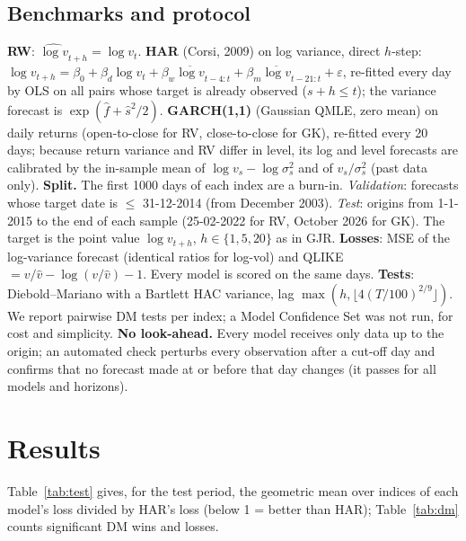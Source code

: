 \documentclass[11pt,a4paper]{article}
\begin{document}
\subsection{Benchmarks and protocol}
\textbf{RW}: $\widehat{\log v}_{t+h}=\log v_t$. \textbf{HAR} (Corsi, 2009) on log variance, direct $h$-step:
$\log v_{t+h}=\beta_0+\beta_d\log v_t+\beta_w\overline{\log v}_{t-4:t}+\beta_m\overline{\log v}_{t-21:t}+\varepsilon$,
re-fitted every day by OLS on all pairs whose target is already observed ($s+h\le t$); the variance
forecast is $\exp(\hat f+\hat s^2/2)$. \textbf{GARCH(1,1)} (Gaussian QMLE, zero mean) on daily returns
(open-to-close for RV, close-to-close for GK), re-fitted every 20 days; because return variance and RV
differ in level, its log and level forecasts are calibrated by the in-sample mean of $\log v_s-\log\sigma^2_s$
and of $v_s/\sigma^2_s$ (past data only).
\textbf{Split.} The first 1000 days of each index are a burn-in. \emph{Validation}: forecasts whose target date
is $\le$ 31-12-2014 (from December 2003). \emph{Test}: origins from 1-1-2015 to the end of each sample
(25-02-2022 for RV, October 2026 for GK). The target is the point value $\log v_{t+h}$, $h\in\{1,5,20\}$ as in GJR.
\textbf{Losses}: MSE of the log-variance forecast (identical ratios for log-vol) and
QLIKE $=v/\hat v-\log(v/\hat v)-1$. Every model is scored on the same days.
\textbf{Tests}: Diebold--Mariano with a Bartlett HAC variance, lag $\max(h,\lfloor4(T/100)^{2/9}\rfloor)$.
We report pairwise DM tests per index; a Model Confidence Set was not run, for cost and simplicity.
\textbf{No look-ahead.} Every model receives only data up to the origin; an automated check perturbs every
observation after a cut-off day and confirms that no forecast made at or before that day changes (it passes for
all models and horizons).

\section{Results}
Table~\ref{tab:test} gives, for the test period, the geometric mean over indices of each model's loss
divided by HAR's loss (below 1 = better than HAR); Table~\ref{tab:dm} counts significant DM wins and losses.

\begin{table}[h]
\centering\scriptsize\setlength{\tabcolsep}{3.6pt}
\resizebox{\textwidth}{!}{}
\caption{Test period (2015--), loss relative to HAR, geometric mean over indices. Bold: the model chosen
on the validation period for that data set and horizon. Lines below the first block are the improvement candidates.}
\label{tab:test}
\end{table}
\end{document}
